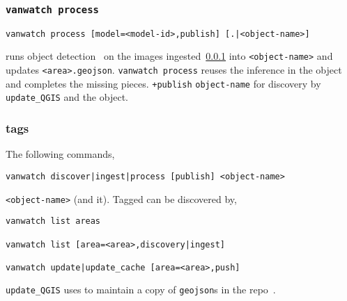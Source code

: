 \subsubsection{\texttt{vanwatch process}}\label{vanwatch_process}

\begin{verbatim}
vanwatch process [model=<model-id>,publish] [.|<object-name>]
\end{verbatim}
%
runs object detection~ on the images ingested~\ref{vanwatch_process} into \texttt{<object-name>} and updates \texttt{<area>.geojson}. \texttt{vanwatch process} reuses the inference in the object and completes the missing pieces. \texttt{+publish}  \texttt{object-name} for discovery by \texttt{update\_QGIS} and  the object.

\subsubsection{tags}\label{vanwatch_tags}

The following commands,

\begin{verbatim}
vanwatch discover|ingest|process [publish] <object-name>
\end{verbatim}
%
 \texttt{<object-name>} (and  it). Tagged  can be discovered by,
%
\begin{verbatim}
vanwatch list areas

vanwatch list [area=<area>,discovery|ingest]

vanwatch update|update_cache [area=<area>,push]
\end{verbatim}
%
\texttt{update\_QGIS} uses  to maintain a copy of \texttt{geojson}s in the repo~.